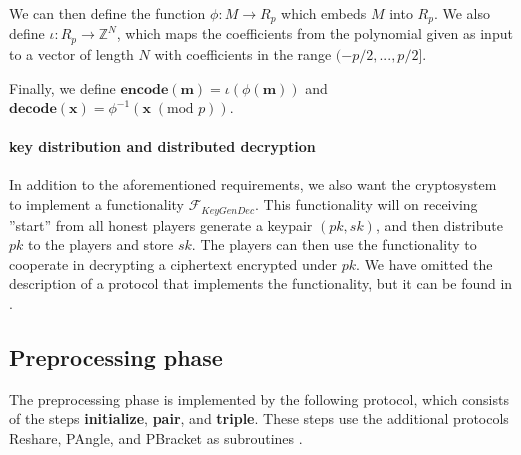 \documentclass[../main.tex]{subfiles}
\begin{document}
We can then define the function $\phi: M \rightarrow R_p$ which embeds $M$ into $R_p$. We also define $\iota : R_p \rightarrow \mathbb{Z}^N$, which maps the coefficients from the polynomial given as input to a vector of length $N$ with coefficients in the range $(-p/2, ..., p/2]$.

Finally, we define $\textbf{encode}(\textbf{m}) = \iota(\phi(\textbf{m}))$ and $\textbf{decode}(\textbf{x}) = \phi^{-1}(\textbf{x} \; (\text{mod } p))$.

\paragraph{key distribution and distributed decryption}
In addition to the aforementioned requirements, we also want the cryptosystem to implement a functionality $\mathcal{F}_{KeyGenDec}$. This functionality will on receiving ''start'' from all honest players generate a keypair $(pk, sk)$, and then distribute $pk$ to the players and store $sk$. The players can then use the functionality to cooperate in decrypting a ciphertext encrypted under $pk$.
We have omitted the description of a protocol that implements the functionality, but it can be found in \cite{damgaard2012multiparty}.

\subsection{Preprocessing phase} \label{subsection: Prep}

The preprocessing phase is implemented by the following protocol, which consists of the steps \textbf{initialize}, \textbf{pair}, and \textbf{triple}. These steps use the additional protocols Reshare, PAngle, and PBracket as subroutines \cite{damgaard2012multiparty}.
\end{document}
